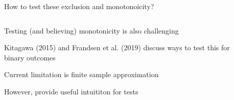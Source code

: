 \documentclass[notes,11pt, aspectratio=169]{beamer}
\newenvironment{wideitemize}{\itemize\addtolength{\itemsep}{10pt}}{\enditemize}
\begin{document}
\begin{frame}{How to test these exclusion and monotonoicity?}
  \begin{columns}[onlytextwidth, T] %
    \begin{column}{.5\textwidth}
      \begin{wideitemize}
      \item<1-> Testing (and believing) monotonicity is also challenging
      \item<2-> Kitagawa (2015) and Frandsen et al. (2019) discuss ways to
        test this for binary outcomes
      \item<2-> Current limitation is finite sample approximation
      \item<2-> However, provide useful intuititon for tests
      \end{wideitemize}
    \end{column}%
    \hfill%
    \begin{column}{.5\textwidth}
    \end{column}%
  \end{columns}
\end{frame}
\end{document}
